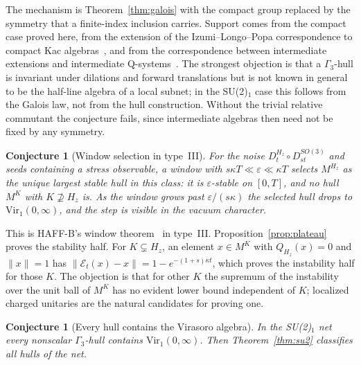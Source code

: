 \documentclass[12pt]{article}
\newtheorem{conjecture}[theorem]{Conjecture}
\theoremstyle{definition}
\theoremstyle{remark}
\newcommand{\Vir}{\mathrm{Vir}}
\begin{document}
The mechanism is Theorem~\ref{thm:galois} with the compact group replaced by the
symmetry that a finite-index inclusion carries. Support comes from the compact case
proved here, from the extension of the Izumi--Longo--Popa correspondence to compact Kac
algebras~\cite{ILP1998}, and from the correspondence between intermediate extensions
and intermediate Q-systems~\cite{BKLR2015}. The strongest objection is that a
\(\Gamma_3\)-hull is invariant under dilations and forward translations but is not
known in general to be the half-line algebra of a local subnet; in the SU(2)\(_1\) case
this follows from the Galois law, not from the hull construction. Without the trivial
relative commutant the conjecture fails, since intermediate algebras then need not be
fixed by any symmetry.

\begin{conjecture}[Window selection in type~III]\label{conj:window}
For the noise \(D^{H_z}_t\circ D^{SO(3)}_{st}\) and seeds containing a stress
observable, a window with \(s\kappa T\ll\varepsilon\ll\kappa T\) selects
\(M^{H_z}\) as the unique largest stable hull in this class: it is \(\varepsilon\)-stable on \([0,T]\), and no hull \(M^K\) with
\(K\not\supseteq H_z\) is. As the window grows past \(\varepsilon/(s\kappa)\) the selected
hull drops to \(\Vir_1(0,\infty)\), and the step is visible in the vacuum character.
\end{conjecture}

This is HAFF-B's window theorem~\cite{HAFFB} in type~III. Proposition~\ref{prop:plateau}
proves the stability half. For \(K\subsetneq H_z\), an element \(x\in M^K\) with
\(Q_{H_z}(x)=0\) and \(\|x\|=1\) has \(\|\mathcal E_t(x)-x\|=1-e^{-(1+s)\kappa t}\), which
proves the instability half for those \(K\). The objection is that for other \(K\) the
supremum of the instability over the unit ball of \(M^K\) has no evident lower bound
independent of \(K\); localized charged unitaries are the natural candidates for
proving one.

\begin{conjecture}[Every hull contains the Virasoro algebra]\label{conj:vir}
In the SU(2)\(_1\) net every nonscalar \(\Gamma_3\)-hull contains \(\Vir_1(0,\infty)\).
Then Theorem~\ref{thm:su2} classifies all hulls of the net.
\end{conjecture}
\end{document}
